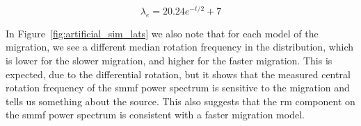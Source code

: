 \begin{equation}
\lambda_{e} = 20.24 e^{-t/2} + 7
\label{eq:exp_lats}
\end{equation}

In Figure~\ref{fig:artificial_sim_lats} we also note that for each model of the migration, we see a different median rotation frequency in the distribution, which is lower for the slower migration, and higher for the faster migration. This is expected, due to the differential rotation, but it shows that the measured central rotation frequency of the \gls{smmf} power spectrum is sensitive to the migration and tells us something about the source. This also suggests that the \gls{rm} component on the \gls{smmf} power spectrum is consistent with a faster migration model.

\begin{figure}[!ht]
	\centering
	\qquad
	 \\
	
	\qquad
	

\end{figure}
